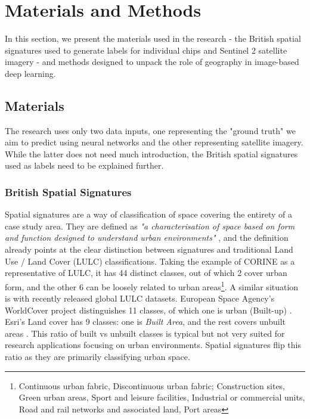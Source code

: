 \section{Materials and Methods}
\label{sec:matmet}

In this section, we present the materials used in the research - the British spatial
signatures used to generate labels for individual chips and Sentinel 2 satellite
imagery - and methods designed to unpack the role of geography in image-based deep
learning.

\subsection{Materials}

The research uses only two data inputs, one representing the "ground truth" we aim to predict using neural networks and the other representing satellite
imagery. While the latter does not need much introduction, the British spatial
signatures used as labels need to be explained further.

\subsubsection{British Spatial Signatures}

Spatial signatures are a way of classification of space covering the entirety of a case
study area. They are defined as \textit{"a characterisation of space based on form and
function designed to understand urban environments"} \citep{dab_mf_2021a}, and the
definition already points at the clear distinction between signatures and traditional
Land Use / Land Cover (LULC) classifications. Taking the example of CORINE
\citep{europeanenvironmentagency1990} as a representative of LULC, it has 44 distinct
classes, out of which 2 cover urban form, and the other 6 can be loosely related to urban
areas\footnote{Continuous urban fabric, Discontinuous urban fabric; Construction sites,
Green urban areas, Sport and leisure facilities, Industrial or commercial units, Road
and rail networks and associated land, Port areas}. A similar situation is with recently
released global LULC datasets. European Space Agency's WorldCover project distinguishes
11 classes, of which one is urban (Built-up) \citep{zanaga_daniele_2021_5571936}. Esri's
Land cover has 9 classes: one is \textit{Built Area}, and the rest covers unbuilt
areas \citep{karra2021global}. This ratio of built vs unbuilt classes is typical but not
very suited for research applications focusing on urban environments. Spatial signatures
flip this ratio as they are primarily classifying urban space.


